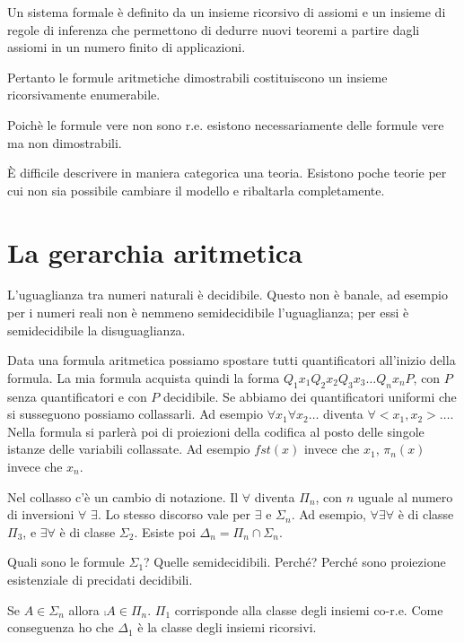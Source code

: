 Un sistema formale è definito da un insieme ricorsivo di assiomi e un insieme di
regole di inferenza che permettono di dedurre nuovi teoremi a partire dagli
assiomi in un numero finito di applicazioni.

Pertanto le formule aritmetiche dimostrabili costituiscono un insieme
ricorsivamente enumerabile.

Poichè le formule vere non sono r.e. esistono necessariamente delle formule
vere ma non dimostrabili.

È difficile descrivere in maniera categorica una teoria. Esistono poche teorie per cui non sia
possibile cambiare il modello e ribaltarla completamente.

\section{La gerarchia aritmetica}

L'uguaglianza tra numeri naturali è decidibile. Questo non è banale, ad esempio per i numeri reali
non è nemmeno semidecidibile l'uguaglianza; per essi è semidecidibile la disuguaglianza.

Data una formula aritmetica possiamo spostare tutti quantificatori all'inizio della formula. La mia
formula acquista quindi la forma $Q_{1} x_{1} Q_{2} x_{2} Q_{3}x_{3} \dotsc Q_{n}x_{n}P$, con $P$ senza
quantificatori e con $P$ decidibile. Se abbiamo dei quantificatori uniformi che si susseguono possiamo
collassarli. Ad esempio $\forall x_{1} \forall x_{2} \dotsc$ diventa $\forall <x_{1},x_{2}> \dotsc$. Nella
formula si parlerà poi di proiezioni della codifica al posto delle singole istanze delle variabili
collassate. Ad esempio $\textit{fst}(x)$ invece che $x_{1}$, $\pi_{n}(x)$ invece che $x_{n}$.

Nel collasso c'è un cambio di notazione. Il $\forall$ diventa $\Pi_{n}$, con $n$ uguale al numero di
inversioni $\forall$ $\exists$. Lo stesso discorso vale per $\exists$ e $\Sigma_{n}$. Ad esempio,
$\forall \exists \forall$ è di classe $\Pi_{3}$, e $\exists \forall$ è di classe $\Sigma_{2}$. Esiste poi
$\Delta_{n} = \Pi_{n} \cap \Sigma_{n}$.

Quali sono le formule $\Sigma_{1}$? Quelle semidecidibili. Perché? Perché sono proiezione
esistenziale di precidati decidibili.

Se $A \in \Sigma_{n}$ allora $\comp{A} \in \Pi_{n}$. $\Pi_{1}$ corrisponde alla classe degli insiemi
co-r.e. Come conseguenza ho che $\Delta_{1}$ è la classe degli insiemi ricorsivi.

